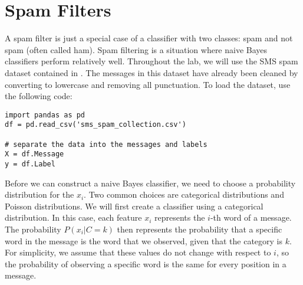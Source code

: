 \section*{Spam Filters}
A spam filter is just a special case of a classifier with two classes: spam and not spam (often called ham). 
Spam filtering is a situation where naive Bayes classifiers perform relatively well.
Throughout the lab, we will use the SMS spam dataset contained in .
The messages in this dataset have already been cleaned by converting to lowercase and removing all punctuation.
To load the dataset, use the following code:
\begin{lstlisting}
import pandas as pd
df = pd.read_csv('sms_spam_collection.csv')

# separate the data into the messages and labels
X = df.Message
y = df.Label
\end{lstlisting}

Before we can construct a naive Bayes classifier, we need to choose a probability distribution for the $x_i$.
Two common choices are categorical distributions and Poisson distributions.
We will first create a classifier using a categorical distribution.
In this case, each feature $x_i$ represents the $i$-th word of a message.
The probability $P(x_i|C=k)$ then represents the probability that a specific word in the message is the word that we observed, given that the category is $k$.
For simplicity, we assume that these values do not change with respect to $i$, so the probability of observing a specific word is the same for every position in a message.

